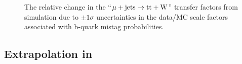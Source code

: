 \begin{figure}[!h]
{  } \\
   ~
   \\
  \caption{\label{fig:tfSyst_bsfl_muToTtw} The relative change in the
    ``$\mu + \textrm{jets} \rightarrow \mathrm{tt+W}$'' transfer factors from
    simulation due to $\pm1\sigma$ uncertainties in the data/MC scale
    factors associated with b-quark mistag probabilities.  }
\end{figure}

\clearpage
\subsection{Extrapolation in \texorpdfstring{\alphat}{AlphaT}}

